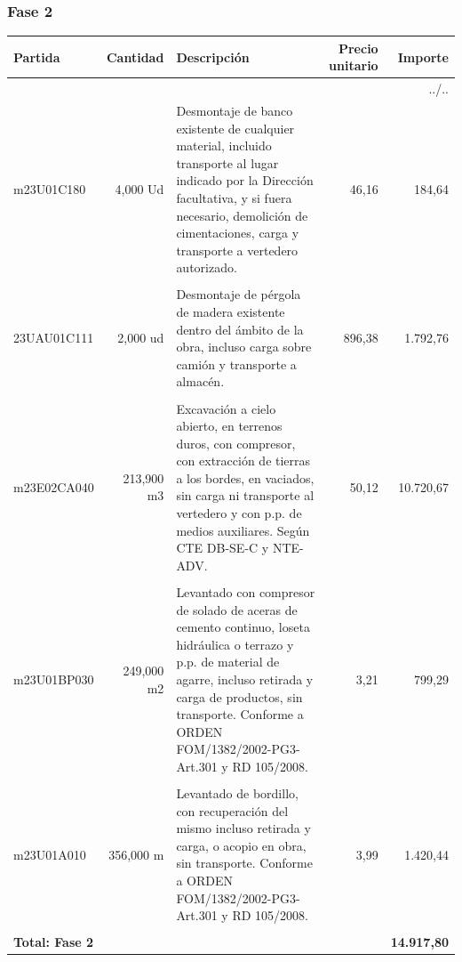 \documentclass{book}%
\begin{document}
\subsubsection{Fase 2}%
\small%
\begin{longtable}{lrlrr}%
Partida&Cantidad&Descripción&\multicolumn{1}{p{1.5cm}}{Precio unitario}&Importe\\%
\hline%
\endhead%
\multicolumn{5}{r}{../..}\\%
\endfoot%
\hline%
\endlastfoot%
m23U01C180&     4,000 Ud&\multicolumn{1}{p{5cm}}{Desmontaje de banco existente de cualquier material, incluido transporte al lugar indicado por la Dirección facultativa, y si fuera necesario, demolición de cimentaciones, carga y transporte a vertedero autorizado.}&     46,16&184,64\\%
&&&&\\%
23UAU01C111&     2,000 ud&\multicolumn{1}{p{5cm}}{Desmontaje de pérgola de madera existente dentro del ámbito de la obra, incluso carga sobre camión y transporte a almacén.}&    896,38&1.792,76\\%
&&&&\\%
m23E02CA040&   213,900 m3&\multicolumn{1}{p{5cm}}{Excavación a cielo abierto, en terrenos duros, con compresor, con extracción de tierras a los bordes, en vaciados, sin carga ni transporte al vertedero y con p.p. de medios auxiliares. Según CTE DB{-}SE{-}C y NTE{-}ADV.}&     50,12&10.720,67\\%
&&&&\\%
m23U01BP030&   249,000 m2&\multicolumn{1}{p{5cm}}{Levantado con compresor de solado de aceras de cemento continuo, loseta hidráulica o terrazo y p.p. de material de agarre, incluso retirada y carga de productos, sin transporte. Conforme a ORDEN FOM/1382/2002{-}PG3{-}Art.301 y RD 105/2008.}&      3,21&799,29\\%
&&&&\\%
m23U01A010&   356,000 m&\multicolumn{1}{p{5cm}}{Levantado de bordillo, con recuperación del mismo incluso retirada y carga, o acopio en obra, sin transporte. Conforme a ORDEN FOM/1382/2002{-}PG3{-}Art.301 y RD 105/2008.}&      3,99&1.420,44\\%
&&&&\\%
\multicolumn{4}{p{8cm}}{\textbf{Total: Fase 2}}&\textbf{14.917,80}\\%
\end{longtable}%
\normalsize

%
\end{document}
